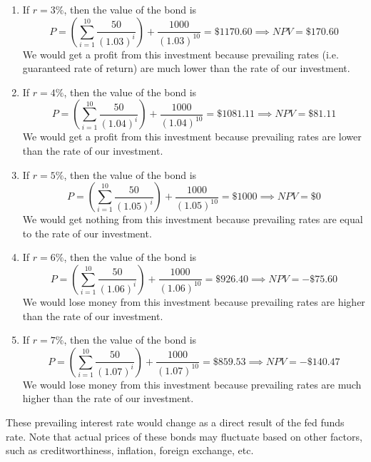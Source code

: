 \documentclass{article}
\begin{document}
    \begin{enumerate}
      \item If $r = 3\%$, then the value of the bond is
      \begin{equation}
        P = \left( \sum_{i=1}^{10} \frac{50}{(1.03)^i} \right) + \frac{1000}{(1.03)^{10}} = \$1170.60 \implies NPV = \$170.60
      \end{equation}
      We would get a profit from this investment because prevailing rates (i.e. guaranteed rate of return) are much lower than the rate of our investment.

      \item If $r = 4\%$, then the value of the bond is
      \begin{equation}
        P = \left( \sum_{i=1}^{10} \frac{50}{(1.04)^i} \right) + \frac{1000}{(1.04)^{10}} = \$1081.11 \implies NPV = \$81.11
      \end{equation}
      We would get a profit from this investment because prevailing rates are lower than the rate of our investment.

      \item If $r = 5\%$, then the value of the bond is
      \begin{equation}
        P = \left( \sum_{i=1}^{10} \frac{50}{(1.05)^i} \right) + \frac{1000}{(1.05)^{10}} = \$1000 \implies NPV = \$0
      \end{equation}
      We would get nothing from this investment because prevailing rates are equal to the rate of our investment.

      \item If $r = 6\%$, then the value of the bond is
      \begin{equation}
        P = \left( \sum_{i=1}^{10} \frac{50}{(1.06)^i} \right) + \frac{1000}{(1.06)^{10}} = \$926.40 \implies NPV = -\$75.60
      \end{equation}
      We would lose money from this investment because prevailing rates are higher than the rate of our investment.

      \item If $r = 7\%$, then the value of the bond is
      \begin{equation}
        P = \left( \sum_{i=1}^{10} \frac{50}{(1.07)^i} \right) + \frac{1000}{(1.07)^{10}} = \$859.53 \implies NPV = -\$140.47
      \end{equation}
      We would lose money from this investment because prevailing rates are much higher than the rate of our investment.
    \end{enumerate}
    These prevailing interest rate would change as a direct result of the fed funds rate. Note that actual prices of these bonds may fluctuate based on other factors, such as creditworthiness, inflation, foreign exchange, etc.
\end{document}
